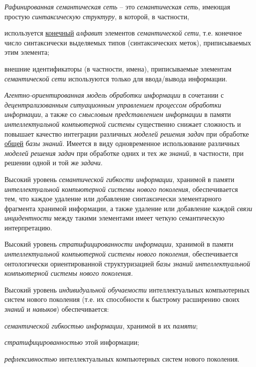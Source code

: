 \textit{Рафинированная семантическая сеть} -- это \textit{семантическая сеть}, имеющая простую \textit{синтаксическую структуру}, в которой, в частности,

\begin{textitemize}
	\item
	используется \underline{конечный} \textit{алфавит} элементов \textit{семантической сети}, т.е. конечное число синтаксически выделяемых типов (синтаксических меток), приписываемых этим элемента;
	\item
	внешние идентификаторы (в частности, имена), приписываемые элементам \textit{семантической сети} используются только для ввода/вывода информации.
\end{textitemize}

\textit{Агентно-ориентированная модель обработки информации} в сочетании с \textit{децентрализованным ситуационным управлением процессом обработки информации}, а также со \textit{смысловым представлением информации} в памяти \textit{интеллектуальной компьютерной системы} существенно снижает сложность и повышает качество интеграции различных \textit{моделей решения задач} при обработке \underline{общей} \textit{базы знаний}. Имеется в виду одновременное использование различных \textit{моделей решения задач} при обработке одних и тех же \textit{знаний}, в частности, при решении одной и той же \textit{задачи}.

Высокий уровень \textit{семантической гибкости информации}, хранимой в памяти \textit{интеллектуальной компьютерной системы нового поколения}, обеспечивается тем, что каждое удаление или добавление синтаксически элементарного фрагмента хранимой информации, а также удаление или добавление каждой \textit{связи инцидентности} между такими элементами имеет четкую семантическую интерпретацию.

Высокий уровень \textit{стратифицированности информации}, хранимой в памяти \textit{интеллектуальной компьютерной системы нового поколения}, обеспечивается онтологически ориентированной структуризацией \textit{базы знаний интеллектуальной компьютерной системы нового поколения}.

Высокий уровень \textit{индивидуальной обучаемости} интеллектуальных компьютерных систем нового поколения (т.е. их способности к быстрому расширению своих \textit{знаний} и \textit{навыков}) обеспечивается:

\begin{textitemize}
	\item
	\textit{семантической гибкостью информации}, хранимой в их \textit{памяти};
	\item
	\textit{стратифицированностью} этой информации;
	\item
	\textit{рефлексивностью} интеллектуальных компьютерных систем нового поколения.
\end{textitemize}

